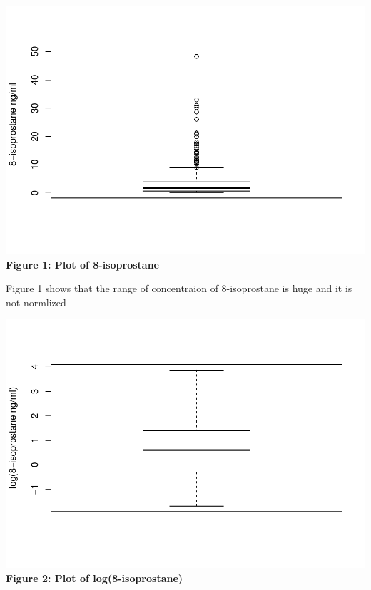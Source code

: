 \documentclass[12pt,]{article}
\newenvironment{Shaded}{\begin{snugshade}}{\end{snugshade}}
\newcommand{\DataTypeTok}[1]{\textcolor[rgb]{0.13,0.29,0.53}{#1}}
\newcommand{\KeywordTok}[1]{\textcolor[rgb]{0.13,0.29,0.53}{\textbf{#1}}}
\newcommand{\NormalTok}[1]{#1}
\newcommand{\OperatorTok}[1]{\textcolor[rgb]{0.81,0.36,0.00}{\textbf{#1}}}
\newcommand{\StringTok}[1]{\textcolor[rgb]{0.31,0.60,0.02}{#1}}
\begin{document}
\includegraphics{872_files/figure-latex/unnamed-chunk-1-1.pdf}
\center \textbf{Figure 1: Plot of 8-isoprostane} \center

Figure 1 shows that the range of concentraion of 8-isoprostane is huge
and it is not normlized

\begin{Shaded}
\end{Shaded}

\includegraphics{872_files/figure-latex/unnamed-chunk-2-1.pdf}
\center \textbf{Figure 2: Plot of log(8-isoprostane)} \center
\end{document}
